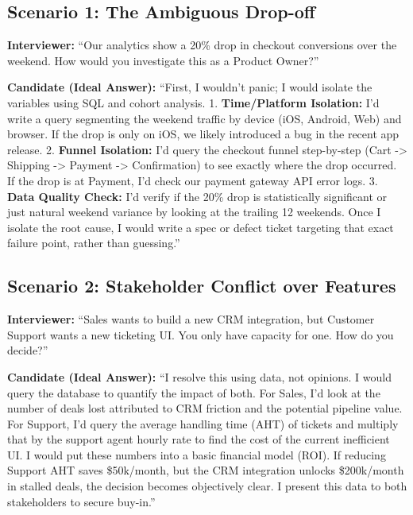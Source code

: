 \subsection{Scenario 1: The Ambiguous
Drop-off}\label{scenario-1-the-ambiguous-drop-off}

\textbf{Interviewer:} ``Our analytics show a 20\% drop in checkout
conversions over the weekend. How would you investigate this as a
Product Owner?''

\textbf{Candidate (Ideal Answer):} ``First, I wouldn't panic; I would
isolate the variables using SQL and cohort analysis. 1.
\textbf{Time/Platform Isolation:} I'd write a query segmenting the
weekend traffic by device (iOS, Android, Web) and browser. If the drop
is only on iOS, we likely introduced a bug in the recent app release. 2.
\textbf{Funnel Isolation:} I'd query the checkout funnel step-by-step
(Cart -\textgreater{} Shipping -\textgreater{} Payment -\textgreater{}
Confirmation) to see exactly where the drop occurred. If the drop is at
Payment, I'd check our payment gateway API error logs. 3. \textbf{Data
Quality Check:} I'd verify if the 20\% drop is statistically significant
or just natural weekend variance by looking at the trailing 12 weekends.
Once I isolate the root cause, I would write a spec or defect ticket
targeting that exact failure point, rather than guessing.''

\subsection{Scenario 2: Stakeholder Conflict over
Features}\label{scenario-2-stakeholder-conflict-over-features}

\textbf{Interviewer:} ``Sales wants to build a new CRM integration, but
Customer Support wants a new ticketing UI. You only have capacity for
one. How do you decide?''

\textbf{Candidate (Ideal Answer):} ``I resolve this using data, not
opinions. I would query the database to quantify the impact of both. For
Sales, I'd look at the number of deals lost attributed to CRM friction
and the potential pipeline value. For Support, I'd query the average
handling time (AHT) of tickets and multiply that by the support agent
hourly rate to find the cost of the current inefficient UI. I would put
these numbers into a basic financial model (ROI). If reducing Support
AHT saves \$50k/month, but the CRM integration unlocks \$200k/month in
stalled deals, the decision becomes objectively clear. I present this
data to both stakeholders to secure buy-in.''

